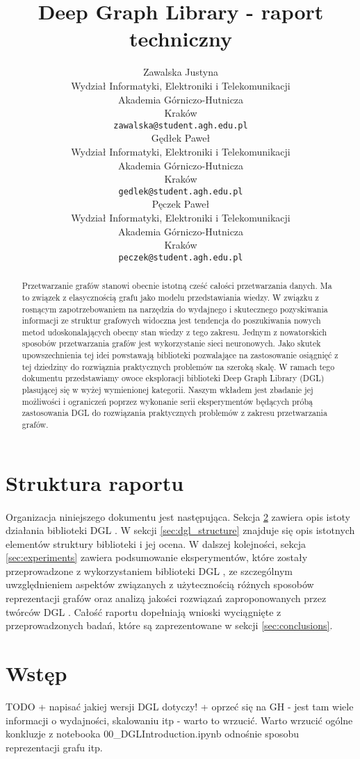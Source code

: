 \documentclass{article}
\title{Deep Graph Library - raport techniczny}
\author{
 Zawalska Justyna \\
  Wydział Informatyki, Elektroniki i Telekomunikacji\\
  Akademia Górniczo-Hutnicza \\
  Kraków \\
  \texttt{zawalska@student.agh.edu.pl} \\
  \And
 Gędłek Paweł \\
  Wydział Informatyki, Elektroniki i Telekomunikacji\\
  Akademia Górniczo-Hutnicza \\
  Kraków \\
  \texttt{gedlek@student.agh.edu.pl} \\
  \And
 Pęczek Paweł \\
  Wydział Informatyki, Elektroniki i Telekomunikacji\\
  Akademia Górniczo-Hutnicza \\
  Kraków \\
  \texttt{peczek@student.agh.edu.pl} \\
}
\begin{document}
\maketitle
\begin{abstract}
Przetwarzanie grafów stanowi obecnie istotną cześć całości przetwarzania danych. Ma to związek z elasycznością grafu jako modelu przedstawiania wiedzy. W związku z rosnącym zapotrzebowaniem na narzędzia do wydajnego i skutecznego pozyskiwania informacji ze struktur grafowych widoczna jest tendencja do poszukiwania nowych metod udoskonalających obecny stan wiedzy z tego zakresu. Jednym z nowatorskich sposobów przetwarzania grafów jest wykorzystanie sieci neuronowych. Jako skutek upowszechnienia tej idei powstawają biblioteki pozwalające na zastosowanie osiągnięć z tej dziedziny do rozwiąznia praktycznych problemów na szeroką skalę. W ramach tego dokumentu przedstawiamy owoce eksploracji biblioteki Deep Graph Library (DGL) plasującej się w wyżej wymienionej kategorii. Naszym wkładem jest zbadanie jej możliwości i ograniczeń poprzez wykonanie serii eksperymentów będących próbą zastosowania DGL do rozwiązania praktycznych problemów z zakresu przetwarzania grafów.
\end{abstract}




\section{Struktura raportu}
\label{sec:report_structure}
\paragraph{}
Organizacja niniejszego dokumentu jest następująca. Sekcja \ref{sec:intro} zawiera opis istoty działania biblioteki DGL \cite{dgl}. W sekcji \ref{sec:dgl_structure} znajduje się opis istotnych elementów struktury biblioteki i jej ocena. W dalszej kolejności, sekcja \ref{sec:experiments} zawiera podsumowanie eksperymentów, które zostały przeprowadzone z wykorzystaniem biblioteki DGL \cite{dgl}, ze szczególnym uwzględnieniem aspektów związanych z użytecznością różnych sposobów reprezentacji grafów oraz analizą jakości rozwiązań zaproponowanych przez twórców DGL \cite{dgl}. Całość raportu dopełniają wnioski wyciągnięte z przeprowadzonych badań, które są zaprezentowane w sekcji \ref{sec:conclusions}.

\section{Wstęp}
\label{sec:intro}
TODO + napisać jakiej wersji DGL dotyczy! + oprzeć się na GH - jest tam wiele informacji o wydajności, skalowaniu itp - warto to wrzucić. Warto wrzucić ogólne konkluzje z notebooka 00\_DGLIntroduction.ipynb odnośnie sposobu reprezentacji grafu itp.
\end{document}
